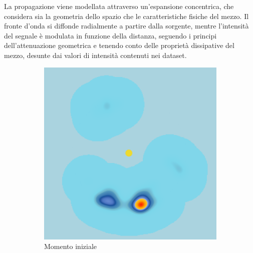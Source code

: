 La propagazione viene modellata attraverso un'espansione concentrica, che considera sia la geometria dello spazio che le caratteristiche fisiche del mezzo. Il fronte d'onda si diffonde radialmente a partire dalla sorgente, mentre l'intensità del segnale è modulata in funzione della distanza, seguendo i principi dell'attenuazione geometrica e tenendo conto delle proprietà dissipative del mezzo, desunte dai valori di intensità contenuti nei dataset.

\begin{figure}[htbp]
    \centering
    \begin{subfigure}{0.32\textwidth}
        \centering
        \includegraphics[width=\linewidth]{images/propagation-1.png}
        \caption{Momento iniziale} %
        \label{fig:propagation-frame-1} %
    \end{subfigure}
    \hfill %
    \begin{subfigure}{0.32\textwidth}
        \centering

\end{subfigure}
\end{figure}
